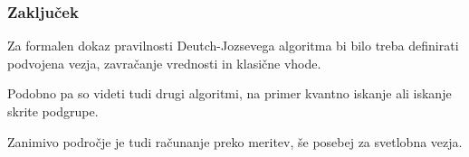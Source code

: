 \documentclass[10pt]{beamer}
\begin{document}
\begin{frame}
  \frametitle{Zaključek}
  Za formalen dokaz pravilnosti Deutch-Jozsevega algoritma bi bilo treba definirati podvojena vezja, zavračanje vrednosti in klasične vhode.

  Podobno pa so videti tudi drugi algoritmi, na primer kvantno iskanje ali iskanje skrite podgrupe.

  Zanimivo področje je tudi računanje preko meritev, še posebej za svetlobna vezja.
\end{frame}
\end{document}
